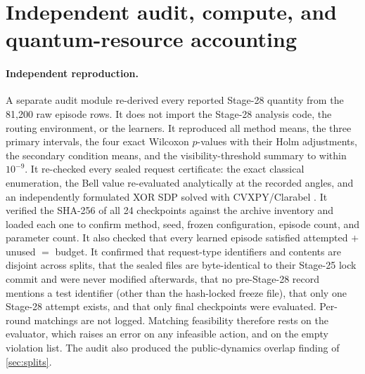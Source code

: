 \documentclass[11pt,a4paper]{article}
\begin{document}
\section{Independent audit, compute, and quantum-resource accounting}\label{sec:audit}

\paragraph{Independent reproduction.} A separate audit module re-derived every reported Stage-28 quantity from the 81{,}200 raw episode rows. It does not import the Stage-28 analysis code, the routing environment, or the learners. It reproduced all method means, the three primary intervals, the four exact Wilcoxon $p$-values with their Holm adjustments, the secondary condition means, and the visibility-threshold summary to within $10^{-9}$. It re-checked every sealed request certificate: the exact classical enumeration, the Bell value re-evaluated analytically at the recorded angles, and an independently formulated XOR SDP solved with CVXPY/Clarabel \cite{diamond2016cvxpy}. It verified the SHA-256 of all 24 checkpoints against the archive inventory and loaded each one to confirm method, seed, frozen configuration, episode count, and parameter count. It also checked that every learned episode satisfied attempted $+$ unused $=$ budget. It confirmed that request-type identifiers and contents are disjoint across splits, that the sealed files are byte-identical to their Stage-25 lock commit and were never modified afterwards, that no pre-Stage-28 record mentions a test identifier (other than the hash-locked freeze file), that only one Stage-28 attempt exists, and that only final checkpoints were evaluated. Per-round matchings are not logged. Matching feasibility therefore rests on the evaluator, which raises an error on any infeasible action, and on the empty violation list. The audit also produced the public-dynamics overlap finding of \cref{sec:splits}.
\end{document}
